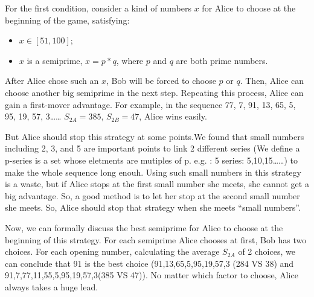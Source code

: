 \documentclass[twocolumn, a4paper]{article}
\begin{document}
For the first condition, consider a kind of numbers $x$ for Alice to choose at the beginning of the game, satisfying:\\
\begin{itemize}
  \item $x\in [51,100]$;\\
  \item $x$ is a semiprime, $x=p*q$, where $p$ and $q$ are both prime numbers. \\
\end{itemize}

After Alice chose such an $x$, Bob will be forced to choose $p$ or $q$. Then, Alice can choose another big semiprime in the next step. Repeating this process, Alice can gain a first-mover advantage. For example, in the sequence 77, 7, 91, 13, 65, 5, 95, 19, 57, 3…… $S_{2A}=385$, $S_{2B}=47$, Alice wins easily. 

But Alice should stop this strategy at some points.We found that small numbers including 2, 3, and 5 are important points to link 2 different series (We define a p-series is a set whose eletments are mutiples of p. e.g. : 5 series: 5,10,15……) to make the whole sequence long enouh. Using such small numbers in this strategy is a waste, but if Alice stops at the first small number she meets, she cannot get a big advantage. So, a good method is to let her stop at the second small number she meets.
So, Alice should stop that strategy when she meets ``small numbers''.


% 


Now, we can formally discuss the best semiprime for Alice to choose at the beginning of this strategy. 
For each semiprime Alice chooses at first, Bob has two choices.
For each opening number, calculating the average $S_{2A}$ of 2 choices, we can conclude that 91 is the best choice (91,13,65,5,95,19,57,3 (284 VS 38) and 91,7,77,11,55,5,95,19,57,3(385 VS 47)). No matter which factor to choose, Alice always takes a huge lead.
\end{document}

